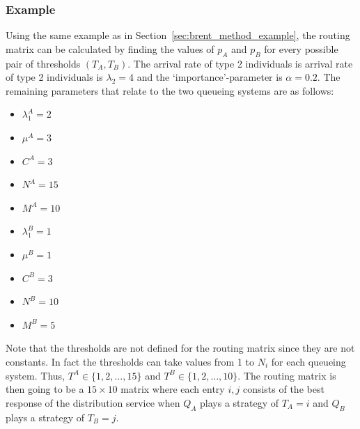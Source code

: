 \subsubsection{Example}\label{sec:routing_matrix_example}
Using the same example as in Section~\ref{sec:brent_method_example}, the routing
matrix can be calculated by finding the values of \(p_A\) and \(p_B\) for every
possible pair of thresholds \((T_A, T_B)\).
The arrival rate of type 2 individuals is arrival rate of type 2 individuals is
\(\lambda_2 = 4\) and the `importance'-parameter is \(\alpha = 0.2\).
The remaining parameters that relate to the two queueing systems are as follows:

\begin{multicols}{2}
    \begin{itemize}
        \item \(\lambda_1^A = 2\)
        \item \(\mu^A = 3\)
        \item \(C^A = 3\)
        \item \(N^A = 15\)
        \item \(M^A = 10\)
        \item \(\lambda_1^B = 1\)
        \item \(\mu^B = 1\)
        \item \(C^B = 3\)
        \item \(N^B = 10\)
        \item \(M^B = 5\)
    \end{itemize}
\end{multicols}

Note that the thresholds are not defined for the routing matrix since they are
not constants.
In fact the thresholds can take values from 1 to \(N_i\) for each queueing
system.
Thus, \(T^A \in \{1, 2, \dots, 15\}\) and \(T^B \in \{1, 2, \dots, 10\}\).
The routing matrix is then going to be a \(15 \times 10\) matrix where each
entry \(i, j\) consists of the best response of the distribution service when
\(Q_A\) plays a strategy of \(T_A=i\) and \(Q_B\) plays a strategy of \(T_B=j\).


